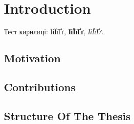 \chapter{Introduction}

Тест кирилиці: ІіЇїҐґ, \textbf{ІіЇїҐґ}, \textit{ІіЇїҐґ}.

\section{Motivation}
\section{Contributions}
\section{Structure Of The Thesis}